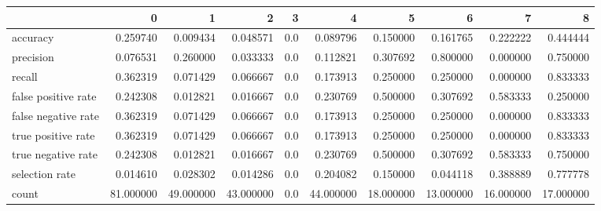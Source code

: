 \begin{tabular}{lrrrrrrrrr}
\toprule
{} &          0 &          1 &          2 &    3 &          4 &          5 &          6 &          7 &          8 \\
\midrule
accuracy            &   0.259740 &   0.009434 &   0.048571 &  0.0 &   0.089796 &   0.150000 &   0.161765 &   0.222222 &   0.444444 \\
precision           &   0.076531 &   0.260000 &   0.033333 &  0.0 &   0.112821 &   0.307692 &   0.800000 &   0.000000 &   0.750000 \\
recall              &   0.362319 &   0.071429 &   0.066667 &  0.0 &   0.173913 &   0.250000 &   0.250000 &   0.000000 &   0.833333 \\
false positive rate &   0.242308 &   0.012821 &   0.016667 &  0.0 &   0.230769 &   0.500000 &   0.307692 &   0.583333 &   0.250000 \\
false negative rate &   0.362319 &   0.071429 &   0.066667 &  0.0 &   0.173913 &   0.250000 &   0.250000 &   0.000000 &   0.833333 \\
true positive rate  &   0.362319 &   0.071429 &   0.066667 &  0.0 &   0.173913 &   0.250000 &   0.250000 &   0.000000 &   0.833333 \\
true negative rate  &   0.242308 &   0.012821 &   0.016667 &  0.0 &   0.230769 &   0.500000 &   0.307692 &   0.583333 &   0.750000 \\
selection rate      &   0.014610 &   0.028302 &   0.014286 &  0.0 &   0.204082 &   0.150000 &   0.044118 &   0.388889 &   0.777778 \\
count               &  81.000000 &  49.000000 &  43.000000 &  0.0 &  44.000000 &  18.000000 &  13.000000 &  16.000000 &  17.000000 \\
\bottomrule
\end{tabular}
